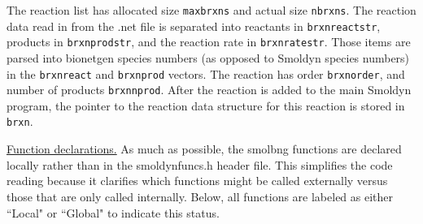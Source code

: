 \documentclass {book}
\begin{document}
The reaction list has allocated size \texttt{maxbrxns} and actual size \texttt{nbrxns}.  The reaction data read in from the .net file is separated into reactants in \texttt{brxnreactstr}, products in \texttt{brxnprodstr}, and the reaction rate in \texttt{brxnratestr}.  Those items are parsed into bionetgen species numbers (as opposed to Smoldyn species numbers) in the \texttt{brxnreact} and \texttt{brxnprod} vectors.  The reaction has order \texttt{brxnorder}, and number of products \texttt{brxnnprod}.  After the reaction is added to the main Smoldyn program, the pointer to the reaction data structure for this reaction is stored in \texttt{brxn}.

\underline{Function declarations.}
As much as possible, the smolbng functions are declared locally rather than in the smoldynfuncs.h header file.  This simplifies the code reading because it clarifies which functions might be called externally versus those that are only called internally.  Below, all functions are labeled as either ``Local" or ``Global" to indicate this status.
\end{document}
